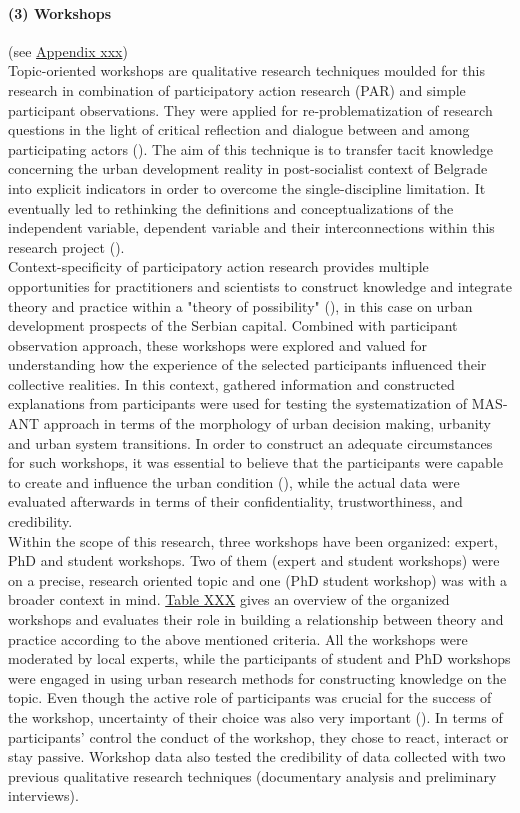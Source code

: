 \documentclass[11pt]{report}
\begin{document}
\paragraph{(3) Workshops} 
(see \href{}{Appendix xxx})
\\
Topic-oriented workshops are qualitative research techniques moulded for this research in combination of participatory action research (PAR) and simple participant observations. They were applied for re-problematization of research questions in the light of critical reflection and dialogue between and among participating actors (\cite{ref mcintyre PAR}). The aim of this technique is to transfer tacit knowledge concerning the urban development reality in post-socialist context of Belgrade into explicit indicators in order to overcome the single-discipline limitation. It eventually led to rethinking the definitions and conceptualizations of the independent variable, dependent variable and their interconnections within this research project (\cite{ref whyte PAR ref}). 
\\
Context-specificity of participatory action research provides multiple opportunities for practitioners and scientists to construct knowledge and integrate theory and practice within a "theory of possibility" (\cite{ref mcintyre PAR}), in this case on urban development prospects of the Serbian capital. Combined with participant observation approach, these workshops were explored and valued for understanding how the experience of the selected participants influenced their collective  realities. In this context, gathered information and constructed explanations from participants were used for testing the systematization of MAS-ANT approach in terms of the morphology of urban decision making, urbanity and urban system transitions. In order to construct an adequate circumstances for such workshops, it was essential to believe that the participants were capable to create and influence the urban condition (\cite{ref mcintyre PAR}), while the actual data were evaluated afterwards in terms of their confidentiality, trustworthiness, and credibility.
\\
Within the scope of this research, three workshops have been organized: expert, PhD and student workshops. Two of them (expert and student workshops) were on a precise, research oriented topic and one (PhD student workshop) was with a broader context in mind. \href{}{Table XXX} gives an overview of the organized workshops and evaluates their role in building a relationship between theory and practice according to the above mentioned criteria. All the workshops were moderated by local experts, while the participants of student and PhD workshops were engaged in using urban research methods for  constructing  knowledge on the topic. Even though the active role of participants was crucial for the success of the workshop, uncertainty of their choice was also very important (\cite{ref mcintyre PAR}). In terms of participants' control the conduct of the workshop, they chose to react, interact or stay passive. Workshop data also tested the credibility of data collected with two previous qualitative research techniques (documentary analysis and preliminary interviews).
\end{document}
